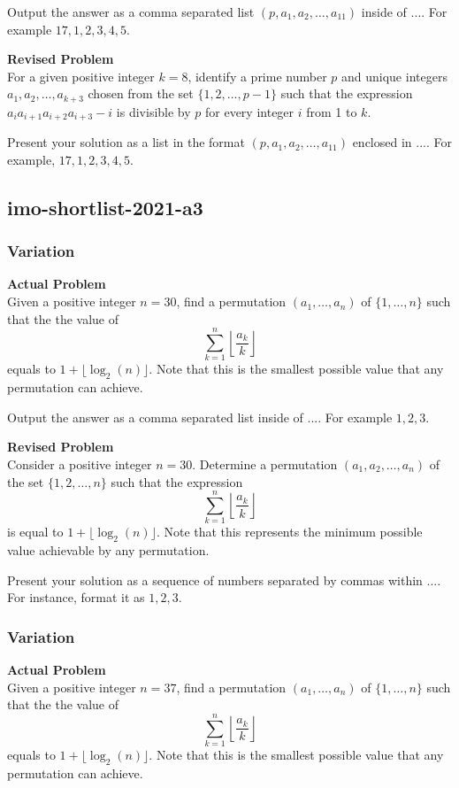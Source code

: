 Output the answer as a comma separated list $(p, a_1, a_2, \ldots, a_11)$ inside of $\boxed{...}$. For example $\boxed{17, 1, 2, 3, 4, 5}$.

\textbf{Revised Problem}\\
For a given positive integer \( k = 8 \), identify a prime number \( p \) and unique integers \( a_1, a_2, \ldots, a_{k+3} \) chosen from the set \(\{1, 2, \ldots, p-1\}\) such that the expression \( a_ia_{i+1}a_{i+2}a_{i+3} - i \) is divisible by \( p \) for every integer \( i \) from 1 to \( k \).

Present your solution as a list in the format \((p, a_1, a_2, \ldots, a_{11})\) enclosed in \(\boxed{...}\). For example, \(\boxed{17, 1, 2, 3, 4, 5}\).

\subsection{imo-shortlist-2021-a3}
\subsubsection{Variation}
\textbf{Actual Problem}\\
Given a positive integer $n = 30$, find a permutation $(a_1,\dots,a_n)$ of $\{1,\dots,n\}$ such that the 
the value of 
$$ \sum_{k=1}^{n}\left\lfloor\frac{a_k}{k}\right\rfloor $$ 
equals to $1+\lfloor \log_2(n) \rfloor$.
Note that this is the smallest possible value that any permutation can achieve.


Output the answer as a comma separated list inside of $\boxed{...}$. For example $\boxed{1, 2, 3}$.

\textbf{Revised Problem}\\
Consider a positive integer $n = 30$. Determine a permutation $(a_1, a_2, \ldots, a_n)$ of the set $\{1, 2, \ldots, n\}$ such that the expression 
$$ \sum_{k=1}^{n}\left\lfloor\frac{a_k}{k}\right\rfloor $$ 
is equal to $1 + \lfloor \log_2(n) \rfloor$. Note that this represents the minimum possible value achievable by any permutation.

Present your solution as a sequence of numbers separated by commas within $\boxed{...}$. For instance, format it as $\boxed{1, 2, 3}$.

\subsubsection{Variation}
\textbf{Actual Problem}\\
Given a positive integer $n = 37$, find a permutation $(a_1,\dots,a_n)$ of $\{1,\dots,n\}$ such that the 
the value of 
$$ \sum_{k=1}^{n}\left\lfloor\frac{a_k}{k}\right\rfloor $$ 
equals to $1+\lfloor \log_2(n) \rfloor$.
Note that this is the smallest possible value that any permutation can achieve.


